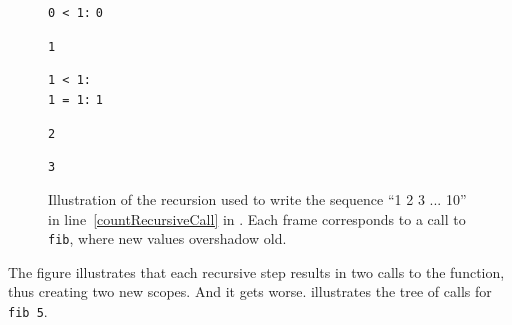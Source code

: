 \begin{figure}
\begin{tcolorbox}[reset,valign lower=bottom,right=0.01\linewidth,squeezed title={\lstinline[language=console]{\$ fsharpc fibRecursive.fsx \&\& mono fibRecursive.exe}}]
\begin{tcbraster}[raster columns=1,raster equal height,raster halign=right]
\begin{tcolorbox}[valign lower=bottom,right=0.01\linewidth,squeezed title={\lstinline{fib}$_1$: \lstinline{n}$_1$\lstinline{ = 3}}]
\begin{tcbraster}[raster columns=2,raster width=0.94\linewidth]
\begin{tcolorbox}[valign lower=bottom,right=0.01\linewidth,squeezed title={\lstinline{fib}$_2$: \lstinline{n}$_2$\lstinline{ = 2}}]
\begin{tcbraster}[raster columns=2,raster width=0.94\linewidth]
\begin{tcolorbox}[valign lower=bottom,right=0.01\linewidth,squeezed title={\lstinline{fib}$_5$: \lstinline{n}$_5$\lstinline{ = 0}}]
                \lstinline{0 < 1:} \cmark
                \tcblower
                \lstinline{0}
              \end{tcolorbox}
            \end{tcbraster}
            \tcblower
            \lstinline{1}
          \end{tcolorbox}
          \begin{tcolorbox}[valign lower=bottom,right=0.01\linewidth,squeezed title={\lstinline{fib}$_3$: \lstinline{n}$_3$ \lstinline{ = 1}}]
            \lstinline{1 < 1:} \xmark\\
            \hspace*{0.03\linewidth}\lstinline{1 = 1:} \cmark
            \tcblower
            \lstinline{1}
          \end{tcolorbox}
        \end{tcbraster}
        \tcblower
        \lstinline{2}
      \end{tcolorbox}
    \end{tcbraster}
    \tcblower
    \lstinline{3}
  \end{tcolorbox}
  \caption{Illustration of the recursion used to write the sequence ``1 2 3 ... 10'' in line~\ref{countRecursiveCall} in . Each frame corresponds to a call to \lstinline{fib}, where new values overshadow old.}
  \label{fig:fibRecursiveScope}
\end{figure}
The figure illustrates that each recursive step results in two calls to the function, thus creating two new scopes. And it gets worse.  illustrates the tree of calls for \lstinline{fib 5}.
